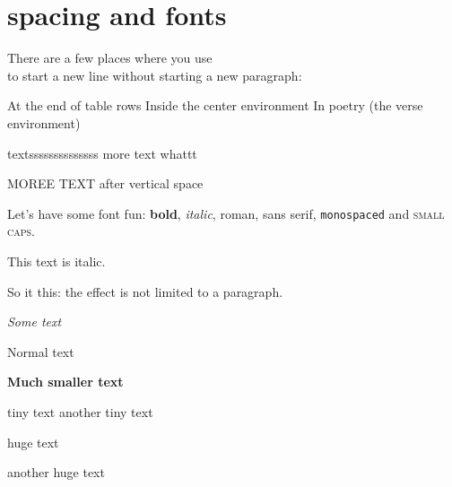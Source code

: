 \documentclass[a4page, 12pt]{article}
\begin{document}
\section{spacing and fonts}
\lipsum[1-2]

There are a few places where you use \\ to start a new line without starting a new paragraph:

At the end of table rows
Inside the center environment
In poetry (the verse environment)


textssssssssssssss \hspace{1cm} more text \hspace{2cm} whattt 

\vspace{5cm}

MOREE TEXT after vertical space


Let's have some font fun: \textbf{bold}, \textit{italic}, \textrm{roman},
\textsf{sans serif}, \texttt{monospaced} and \textsc{small caps}.

{\itshape

This text is italic.

So it this: the effect is not limited to a paragraph.

}

{\itshape\large Some text\par}
Normal text
{\bfseries\small Much smaller text\par}

\tiny tiny text  another tiny text

\huge huge text\par another huge text
\end{document}
